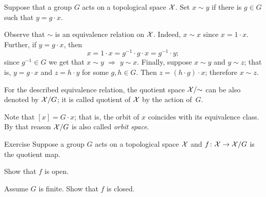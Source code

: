 Suppose that a group $G$ acts on a topological space $\mathcal{X}$.
Set $x\sim y$ if there is $g\in G$ such that $y=g\cdot x$.

Observe that $\sim$ is an equivalence relation on $\mathcal{X}$.
Indeed, 
$x\sim x$ since $x=1\cdot x$.
Further, if $y=g\cdot x$, then 
\[x=1\cdot x=g^{-1}\cdot g\cdot  x=g^{-1}\cdot y;\] since $g^{-1}\in G$ we get that $x\sim y$
$\Longrightarrow$
$y\sim x$.
Finally, suppose $x\sim y$ and $y\sim z$;
that is, $y=g\cdot x$ and $z=h\cdot y$ for some $g,h\in G$.
Then $z=(h\cdot g)\cdot x$;
therefore $x\sim z$.

For the described equivalence relation, the quotient space $\mathcal{X}/{\sim}$ can be also denoted by $\mathcal{X}/G$;
it is called quotient of $\mathcal{X}$ by the action of~$G$.

Note that $[x]=G\cdot x$; that is, the orbit of $x$ coincides with its equivalence class.
By that reason $\mathcal{X}/G$ is also called \emph{orbit space}.

\begin{thm}{Exercise}\label{ex:quotient-map}
Suppose a group $G$ acts on a topological space $\mathcal{X}$ and $f\colon\mathcal{X}\to \mathcal{X}/G$ is the quotient map.

\begin{subthm}{}
Show that $f$ is open.
\end{subthm}

\begin{subthm}{}
Assume $G$ is finite.
Show that $f$ is closed.
\end{subthm}

\end{thm}

